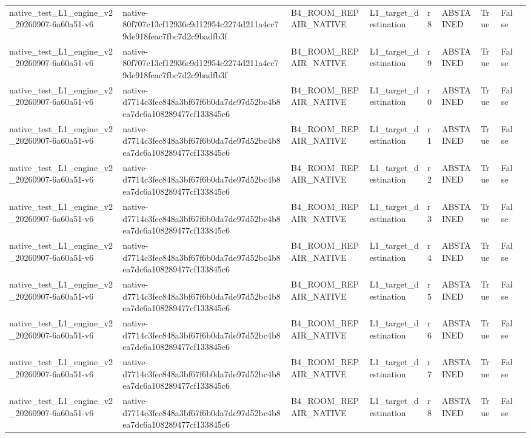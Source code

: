 \begin{tabular}{lllllllll}
native\_test\_L1\_engine\_v2\_20260907-6a60a51-v6 & native-80f707c13cf12936c9d12954c2274d211a4cc79de918feac7fbc7d2c9badfb3f & B4\_ROOM\_REPAIR\_NATIVE & L1\_target\_destination & r8 & ABSTAINED & True & False &  \\
native\_test\_L1\_engine\_v2\_20260907-6a60a51-v6 & native-80f707c13cf12936c9d12954c2274d211a4cc79de918feac7fbc7d2c9badfb3f & B4\_ROOM\_REPAIR\_NATIVE & L1\_target\_destination & r9 & ABSTAINED & True & False &  \\
native\_test\_L1\_engine\_v2\_20260907-6a60a51-v6 & native-d7714c3fec848a3bf67f6b0da7de97d52bc4b8ea7dc6a108289477cf133845c6 & B4\_ROOM\_REPAIR\_NATIVE & L1\_target\_destination & r0 & ABSTAINED & True & False &  \\
native\_test\_L1\_engine\_v2\_20260907-6a60a51-v6 & native-d7714c3fec848a3bf67f6b0da7de97d52bc4b8ea7dc6a108289477cf133845c6 & B4\_ROOM\_REPAIR\_NATIVE & L1\_target\_destination & r1 & ABSTAINED & True & False &  \\
native\_test\_L1\_engine\_v2\_20260907-6a60a51-v6 & native-d7714c3fec848a3bf67f6b0da7de97d52bc4b8ea7dc6a108289477cf133845c6 & B4\_ROOM\_REPAIR\_NATIVE & L1\_target\_destination & r2 & ABSTAINED & True & False &  \\
native\_test\_L1\_engine\_v2\_20260907-6a60a51-v6 & native-d7714c3fec848a3bf67f6b0da7de97d52bc4b8ea7dc6a108289477cf133845c6 & B4\_ROOM\_REPAIR\_NATIVE & L1\_target\_destination & r3 & ABSTAINED & True & False &  \\
native\_test\_L1\_engine\_v2\_20260907-6a60a51-v6 & native-d7714c3fec848a3bf67f6b0da7de97d52bc4b8ea7dc6a108289477cf133845c6 & B4\_ROOM\_REPAIR\_NATIVE & L1\_target\_destination & r4 & ABSTAINED & True & False &  \\
native\_test\_L1\_engine\_v2\_20260907-6a60a51-v6 & native-d7714c3fec848a3bf67f6b0da7de97d52bc4b8ea7dc6a108289477cf133845c6 & B4\_ROOM\_REPAIR\_NATIVE & L1\_target\_destination & r5 & ABSTAINED & True & False &  \\
native\_test\_L1\_engine\_v2\_20260907-6a60a51-v6 & native-d7714c3fec848a3bf67f6b0da7de97d52bc4b8ea7dc6a108289477cf133845c6 & B4\_ROOM\_REPAIR\_NATIVE & L1\_target\_destination & r6 & ABSTAINED & True & False &  \\
native\_test\_L1\_engine\_v2\_20260907-6a60a51-v6 & native-d7714c3fec848a3bf67f6b0da7de97d52bc4b8ea7dc6a108289477cf133845c6 & B4\_ROOM\_REPAIR\_NATIVE & L1\_target\_destination & r7 & ABSTAINED & True & False &  \\
native\_test\_L1\_engine\_v2\_20260907-6a60a51-v6 & native-d7714c3fec848a3bf67f6b0da7de97d52bc4b8ea7dc6a108289477cf133845c6 & B4\_ROOM\_REPAIR\_NATIVE & L1\_target\_destination & r8 & ABSTAINED & True & False &  \\

\end{tabular}
